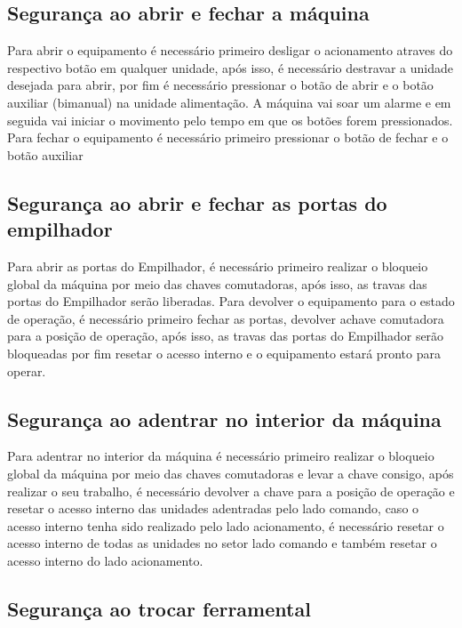 \subsection{Segurança ao abrir e fechar a máquina}

Para abrir o equipamento é necessário primeiro desligar o acionamento atraves do respectivo botão em qualquer unidade, após isso, é necessário destravar a unidade 
desejada para abrir, por fim é necessário pressionar o botão de abrir e o botão auxiliar (bimanual) na unidade alimentação. A máquina vai soar um alarme e em seguida
vai iniciar o movimento pelo tempo em que os botões forem pressionados. Para fechar o equipamento é necessário primeiro pressionar o botão de fechar e o botão auxiliar

\subsection{Segurança ao abrir e fechar as portas do empilhador}

Para abrir as portas do Empilhador, é necessário primeiro realizar o bloqueio global da máquina por meio das chaves comutadoras, após isso, as travas das portas do
Empilhador serão liberadas. Para devolver o equipamento para o estado de operação, é necessário primeiro fechar as portas, devolver achave comutadora para a posição de 
operação, após isso, as travas das portas do Empilhador serão bloqueadas por fim resetar o acesso interno e o equipamento estará pronto para operar.

\newpage
\thispagestyle{fancy}
\vspace*{40 pt}

\subsection{Segurança ao adentrar no interior da máquina}

Para adentrar no interior da máquina é necessário primeiro realizar o bloqueio global da máquina por meio das chaves comutadoras e levar a chave consigo, após realizar o
seu trabalho, é necessário devolver a chave para a posição de operação e resetar o acesso interno das unidades adentradas pelo lado comando, caso o acesso interno tenha
sido realizado pelo lado acionamento, é necessário resetar o acesso interno de todas as unidades no setor lado comando e também resetar o acesso interno do lado acionamento.


\subsection{Segurança ao trocar ferramental}

